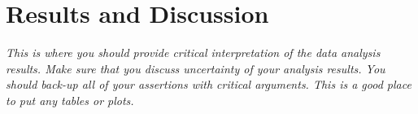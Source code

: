 \section{Results and Discussion}
\textit{This is where you should provide critical interpretation of the data analysis results. Make sure that you discuss uncertainty of your analysis results. You should back-up all of your assertions with critical arguments. This is a 
good place to put any tables or plots.}